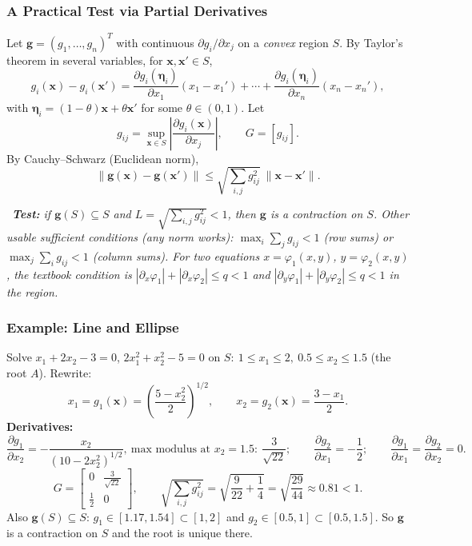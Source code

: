 \documentclass[hidelinks]{article}
\newcommand{\callout}[1]{\par\smallskip\noindent{\color{capri}$\blacktriangleright$}\ \textit{#1}\par\smallskip}
\newcommand{\abs}[1]{\left|#1\right|}
\begin{document}
\subsubsection{A Practical Test via Partial Derivatives}

Let $\mathbf g=(g_1,\dots,g_n)^T$ with continuous $\partial g_i/\partial x_j$ on a \emph{convex} region $S$. By Taylor's theorem in several variables, for $\mathbf x,\mathbf x'\in S$,
\[
g_i(\mathbf x)-g_i(\mathbf x')=\frac{\partial g_i(\boldsymbol\eta_i)}{\partial x_1}(x_1-x_1')+\cdots+\frac{\partial g_i(\boldsymbol\eta_i)}{\partial x_n}(x_n-x_n'),
\]
with $\boldsymbol\eta_i=(1-\theta)\mathbf x+\theta\mathbf x'$ for some $\theta\in(0,1)$. Let
\[
g_{ij}=\sup_{\mathbf x\in S}\abs{\frac{\partial g_i(\mathbf x)}{\partial x_j}},\qquad G=[g_{ij}] .
\]
By Cauchy--Schwarz (Euclidean norm),
\[
\|\mathbf g(\mathbf x)-\mathbf g(\mathbf x')\|\le\sqrt{\sum_{i,j}g_{ij}^2}\ \|\mathbf x-\mathbf x'\| .
\]
\callout{\textbf{Test:} if $\mathbf g(S)\subseteq S$ and $L=\sqrt{\sum_{i,j}g_{ij}^2}<1$, then $\mathbf g$ is a contraction on $S$. Other usable sufficient conditions (any norm works): $\max_i\sum_jg_{ij}<1$ (row sums) or $\max_j\sum_ig_{ij}<1$ (column sums). For two equations $x=\varphi_1(x,y)$, $y=\varphi_2(x,y)$, the textbook condition is $\abs{\partial_x\varphi_1}+\abs{\partial_x\varphi_2}\le q<1$ and $\abs{\partial_y\varphi_1}+\abs{\partial_y\varphi_2}\le q<1$ in the region.}

\subsubsection{Example: Line and Ellipse}

Solve $x_1+2x_2-3=0$, $2x_1^2+x_2^2-5=0$ on $S:\ 1\le x_1\le2,\ 0.5\le x_2\le1.5$ (the root $A$). Rewrite:
\[
x_1=g_1(\mathbf x)=\left(\frac{5-x_2^2}{2}\right)^{1/2},\qquad x_2=g_2(\mathbf x)=\frac{3-x_1}{2}.
\]
\textbf{Derivatives:}
\[
\frac{\partial g_1}{\partial x_2}=-\frac{x_2}{(10-2x_2^2)^{1/2}},\ \text{max modulus at }x_2=1.5:\ \frac{3}{\sqrt{22}};\qquad
\frac{\partial g_2}{\partial x_1}=-\frac12;\qquad \frac{\partial g_1}{\partial x_1}=\frac{\partial g_2}{\partial x_2}=0 .
\]
\[
G=\begin{bmatrix}0&\frac{3}{\sqrt{22}}\\[2pt]\frac12&0\end{bmatrix},\qquad
\sqrt{\sum_{i,j}g_{ij}^2}=\sqrt{\frac9{22}+\frac14}=\sqrt{\frac{29}{44}}\approx0.81<1 .
\]
Also $\mathbf g(S)\subseteq S$: $g_1\in[1.17,1.54]\subset[1,2]$ and $g_2\in[0.5,1]\subset[0.5,1.5]$. So $\mathbf g$ is a contraction on $S$ and the root is unique there.
\end{document}
